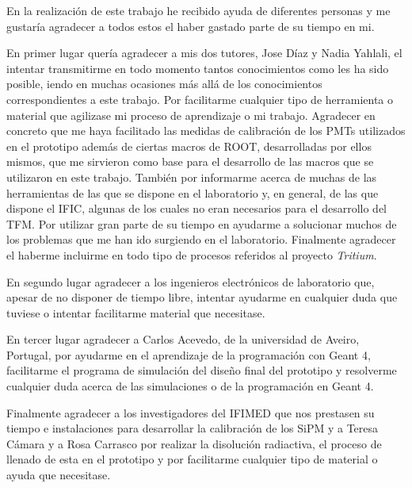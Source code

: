 En la realización de este trabajo he recibido ayuda de diferentes personas y me gustaría agradecer a todos estos el haber gastado parte de su tiempo en mi.

En primer lugar quería agradecer a mis dos tutores, Jose Díaz y Nadia Yahlali, el intentar transmitirme en todo momento tantos conocimientos como les ha sido posible, iendo en muchas ocasiones más allá de los conocimientos correspondientes a este trabajo. Por facilitarme cualquier tipo de herramienta o material que agilizase mi proceso de aprendizaje o mi trabajo. Agradecer en concreto que me haya facilitado las medidas de calibración de los PMTs utilizados en el prototipo además de ciertas macros de ROOT, desarrolladas por ellos mismos, que me sirvieron como base para el desarrollo de las macros que se utilizaron en este trabajo. También por informarme acerca de muchas de las herramientas de las que se dispone en el laboratorio y, en general, de las que dispone el IFIC, algunas de los cuales no eran necesarios para el desarrollo del TFM. Por utilizar gran parte de su tiempo en ayudarme a solucionar muchos de los problemas que me han ido surgiendo en el laboratorio. Finalmente agradecer el haberme incluirme en todo tipo de procesos referidos al proyecto \textit{Tritium}. 

En segundo lugar agradecer a los ingenieros electrónicos de laboratorio que, apesar de no disponer de tiempo libre, intentar ayudarme en cualquier duda que tuviese o intentar facilitarme material que necesitase.

En tercer lugar agradecer a Carlos Acevedo, de la universidad de Aveiro, Portugal, por ayudarme en el aprendizaje de la programación con Geant 4, facilitarme el programa de simulación del diseño final del prototipo y resolverme cualquier duda acerca de las simulaciones o de la programación en Geant 4.

Finalmente agradecer a los investigadores del IFIMED que nos prestasen su tiempo e instalaciones para desarrollar la calibración de los SiPM  y a Teresa Cámara y a Rosa Carrasco por realizar la disolución radiactiva, el proceso de llenado de esta en el prototipo y por facilitarme cualquier tipo de material o ayuda que necesitase.